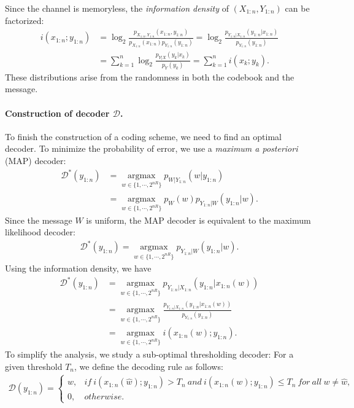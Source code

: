 \documentclass{article}
\numberwithin{equation}{section}
\renewcommand{\cal}{\mathcal}
\newcommand{\wh}{\widehat}
\DeclareMathOperator{\argmax}{argmax}
\theoremstyle{plain}
\theoremstyle{definition}
\begin{document}
Since the channel is memoryless, the \textit{information density} of $(X_{1:n},Y_{1:n})$ can be factorized:
\begin{align*}
	i(x_{1:n};y_{1:n})&=\log_2\frac{p_{X_{1:n},Y_{1:n}}(x_{1:n},y_{1:n})}{p_{X_{1:n}}(x_{1:n})p_{Y_{1:n}}(y_{1:n})}=\log_2\frac{p_{Y_{1:n}|X_{1:n}}(y_{1:n}|x_{1:n})}{p_{Y_{1:n}}(y_{1:n})}\\
	&=\sum_{k=1}^n\log_2\frac{p_{Y|X}(y_k|x_k)}{p_Y(y_k)}=\sum_{k=1}^n i(x_k;y_k).
\end{align*}
These distributions arise from the randomness in both the codebook and the message. 
\paragraph{Construction of decoder $\cal{D}$.} To finish the construction of a coding scheme, we need to find an optimal decoder. To minimize the probability of error, we use a \textit{maximum a posteriori} (MAP) decoder:
\begin{align*}
	\cal{D}^*(y_{1:n})&=\underset{w\in\{1,\cdots,2^{nR}\}}{\argmax} p_{W|Y_{1:n}}(w|y_{1:n})\\
	&=\underset{w\in\{1,\cdots,2^{nR}\}}{\argmax} p_W(w)p_{Y_{1:n}|W}(y_{1:n}|w).
\end{align*}
Since the message $W$ is uniform, the MAP decoder is equivalent to the maximum likelihood decoder:
\begin{align*}
	\cal{D}^*(y_{1:n})=\underset{w\in\{1,\cdots,2^{nR}\}}{\argmax} p_{Y_{1:n}|W}(y_{1:n}|w).
\end{align*}
Using the information density, we have
\begin{align*}
	\cal{D}^*(y_{1:n})&=\underset{w\in\{1,\cdots,2^{nR}\}}{\argmax} p_{Y_{1:n}|X_{1:n}}(y_{1:n}|x_{1:n}(w))\\
	&=\underset{w\in\{1,\cdots,2^{nR}\}}{\argmax} \frac{p_{Y_{1:n}|X_{1:n}}(y_{1:n}|x_{1:n}(w))}{p_{Y_{1:n}}(y_{1:n})}
	\\
	&=\underset{w\in\{1,\cdots,2^{nR}\}}{\argmax}i(x_{1:n}(w);y_{1:n}).
\end{align*}
To simplify the analysis, we study a sub-optimal thresholding decoder: For a given threshold $T_n$, we define the decoding rule as follows:
\begin{align*}
	\cal{D}(y_{1:n})=\begin{cases}
		\wh{w}, &if\ i(x_{1:n}(\wh{w});y_{1:n})>T_n\ and\ i(x_{1:n}(w);y_{1:n})\leq T_n\ for\ all\ w\neq\wh{w},\\
		0, &otherwise.
	\end{cases}
\end{align*}
\end{document}
